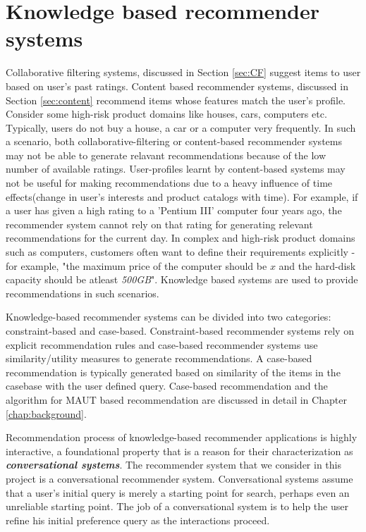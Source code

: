 \section{Knowledge based recommender systems}
Collaborative filtering systems, discussed in Section \ref{sec:CF} suggest items to user based on user's past ratings.
Content based recommender systems, discussed in Section \ref{sec:content} recommend items whose features match the user's profile.
Consider some high-risk product domains like houses, cars, computers etc.
Typically, users do not buy a house, a car or a computer very frequently. 
In such a scenario, both collaborative-filtering or content-based recommender systems may not be able to generate relavant recommendations because of the low number of available ratings.
User-profiles learnt by content-based systems may not be useful for making recommendations due to a heavy influence of time effects(change in user's interests and product catalogs with time). 
For example, if a user has given a high rating to a 'Pentium III' computer four years ago, the recommender system cannot rely on that rating for generating relevant recommendations for the current day.
In complex and high-risk product domains such as computers, customers often want to define their requirements explicitly - for example, "the maximum price of the computer should be $x$ and the hard-disk capacity should be atleast \textit{500GB}".
Knowledge based systems are used to provide recommendations in such scenarios.

Knowledge-based recommender systems can be divided into two categories: constraint-based and case-based.
Constraint-based recommender systems rely on explicit recommendation rules and case-based recommender systems use similarity/utility measures to generate recommendations. 
A case-based recommendation is typically generated based on similarity of the items in the casebase with the user defined query.
Case-based recommendation and the algorithm for MAUT based recommendation are discussed in detail in Chapter \ref{chap:background}.

Recommendation process of knowledge-based recommender applications is highly interactive, a foundational property that is a reason for their characterization as \textit{\textbf{conversational systems}}. The recommender system that we consider in this project is a conversational recommender system.
Conversational systems assume that a user's initial query is merely a starting point for search, perhaps even an unreliable starting point. The job of a conversational system is to help the user refine his initial preference query as the interactions proceed.
